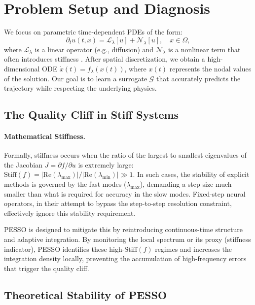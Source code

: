 \documentclass{article}
\theoremstyle{plain}
\theoremstyle{definition}
\theoremstyle{remark}
\begin{document}
\section{Problem Setup and Diagnosis}

We focus on parametric time-dependent PDEs of the form:
\begin{equation}
  \partial_t u(t,x) = \mathcal{L}_\lambda[u] + \mathcal{N}_\lambda[u], 
  \quad x \in \Omega,
\end{equation}
where $\mathcal{L}_\lambda$ is a linear operator (e.g., diffusion) and $\mathcal{N}_\lambda$ is a nonlinear term that often introduces stiffness \cite{yu2024dynSysIntro}. After spatial discretization, we obtain a high-dimensional ODE $\dot{x}(t) = f_\lambda(x(t))$, where $x(t)$ represents the nodal values of the solution. Our goal is to learn a surrogate $\mathcal{G}$ that accurately predicts the trajectory while respecting the underlying physics.

\subsection{The Quality Cliff in Stiff Systems}

\paragraph{Mathematical Stiffness.} Formally, stiffness occurs when the ratio of the largest to smallest eigenvalues of the Jacobian $J = \partial f / \partial u$ is extremely large: $\text{Stiff}(f) = |\text{Re}(\lambda_{\max})| / |\text{Re}(\lambda_{\min})| \gg 1$. In such cases, the stability of explicit methods is governed by the fast modes ($\lambda_{\max}$), demanding a step size much smaller than what is required for accuracy in the slow modes. Fixed-step neural operators, in their attempt to bypass the step-to-step resolution constraint, effectively ignore this stability requirement.

PESSO is designed to mitigate this by reintroducing continuous-time structure and adaptive integration. By monitoring the local spectrum or its proxy (stiffness indicator), PESSO identifies these high-$\text{Stiff}(f)$ regimes and increases the integration density locally, preventing the accumulation of high-frequency errors that trigger the quality cliff.

\subsection{Theoretical Stability of PESSO}
\label{sec:theory_main}
\end{document}
